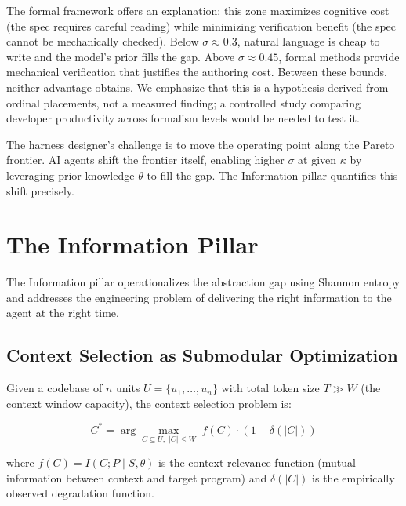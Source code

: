 \documentclass[11pt, a4paper, logo, copyright]{googledeepmind}
\begin{document}
The formal framework offers an explanation: this zone maximizes cognitive cost (the spec requires careful reading) while minimizing verification benefit (the spec cannot be mechanically checked). Below $\sigma \approx 0.3$, natural language is cheap to write and the model's prior fills the gap. Above $\sigma \approx 0.45$, formal methods provide mechanical verification that justifies the authoring cost. Between these bounds, neither advantage obtains. We emphasize that this is a hypothesis derived from ordinal placements, not a measured finding; a controlled study comparing developer productivity across formalism levels would be needed to test it.

The harness designer's challenge is to move the operating point along the Pareto frontier. AI agents shift the frontier itself, enabling higher $\sigma$ at given $\kappa$ by leveraging prior knowledge $\theta$ to fill the gap. The Information pillar quantifies this shift precisely.


\section{The Information Pillar}
\label{sec:information}

The Information pillar operationalizes the abstraction gap using Shannon entropy and addresses the engineering problem of delivering the right information to the agent at the right time.

\subsection{Context Selection as Submodular Optimization}

Given a codebase of $n$ units $U = \{u_1, \ldots, u_n\}$ with total token size $T \gg W$ (the context window capacity), the context selection problem is:

\begin{equation}
    C^* = \arg\max_{C \subseteq U,\; |C| \leq W} \; f(C) \cdot (1 - \delta(|C|))
\end{equation}

where $f(C) = I(C; P \mid S, \theta)$ is the context relevance function (mutual information between context and target program) and $\delta(|C|)$ is the empirically observed degradation function.
\end{document}
